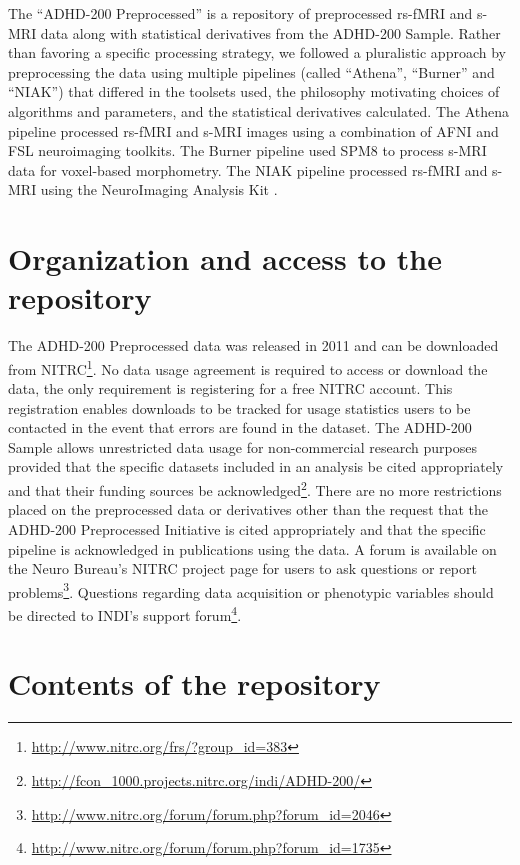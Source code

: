 \documentclass[preprint,12pt,3p]{elsarticle}
\begin{document}
The ``ADHD-200 Preprocessed'' is a repository of preprocessed rs-fMRI and s-MRI data along with statistical derivatives from the ADHD-200 Sample. Rather than favoring a specific processing strategy, we followed a pluralistic approach by preprocessing the data using multiple pipelines (called ``Athena'', ``Burner'' and ``NIAK'') that differed in the toolsets used, the philosophy motivating choices of algorithms and parameters, and the statistical derivatives calculated. The Athena pipeline processed rs-fMRI and s-MRI images using a combination of AFNI \cite{cox1996afni} and FSL \cite{smith2004advances} neuroimaging toolkits. The Burner pipeline used SPM8 \cite{ashburner2012spm8} to process s-MRI data for voxel-based morphometry. The NIAK pipeline processed rs-fMRI and s-MRI using the NeuroImaging Analysis Kit \cite{Bellec2011}. 


\section{Organization and access to the repository}

The ADHD-200 Preprocessed data was released in 2011 and can be downloaded from NITRC\footnote{\url{http://www.nitrc.org/frs/?group_id=383}}. No data usage agreement is required to access or download the data, the only requirement is registering for a free NITRC account. This registration enables downloads to be tracked for usage statistics users to be contacted in the event that errors are found in the dataset. The ADHD-200 Sample allows unrestricted data usage for non-commercial research purposes provided that the specific datasets included in an analysis be cited appropriately and that their funding sources be acknowledged\footnote{\url{http://fcon_1000.projects.nitrc.org/indi/ADHD-200/}}. There are no more restrictions placed on the preprocessed data or derivatives other than the request that the ADHD-200 Preprocessed Initiative is cited appropriately and that the specific pipeline is acknowledged in publications using the data. A forum is available on the Neuro Bureau's NITRC project page for users to ask questions or report problems\footnote{\url{http://www.nitrc.org/forum/forum.php?forum_id=2046}}. Questions regarding data acquisition or phenotypic variables should be directed to INDI's support forum\footnote{\url{http://www.nitrc.org/forum/forum.php?forum_id=1735}}. 

\section{Contents of the repository}
\end{document}
